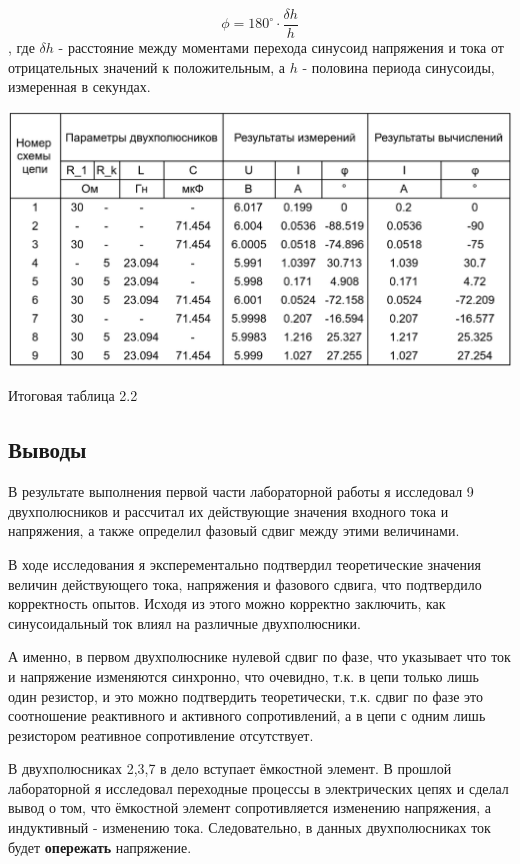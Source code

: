 \[
	\phi = 180^\circ \cdot \frac{\delta h}{h}
\]
, где $\delta h$ - расстояние между моментами перехода синусоид напряжения и тока от отрицательных значений к положительным, а $h$ - половина периода синусоиды, измеренная в секундах.

\begin{table}[H]
	\captionsetup{labelformat=empty}
	\centering
	\includegraphics[width=1\textwidth]{./data/table_2-2.png}
	\caption{Итоговая таблица 2.2}
\end{table}

\subsection{Выводы}
В результате выполнения первой части лабораторной работы я исследовал 9 двухполюсников и рассчитал их действующие значения входного тока и напряжения, а также определил фазовый сдвиг между этими величинами.

В ходе исследования я эксперементально подтвердил теоретические значения величин действующего тока, напряжения и фазового сдвига, что подтвердило корректность опытов. Исходя из этого можно корректно заключить, как синусоидальный ток влиял на различные двухполюсники.

А именно, в первом двухполюснике нулевой сдвиг по фазе, что указывает что ток и напряжение изменяются синхронно, что очевидно, т.к. в цепи только лишь один резистор, и это можно подтвердить теоретически, т.к. сдвиг по фазе это соотношение реактивного и активного сопротивлений, а в цепи с одним лишь резистором реативное сопротивление отсутствует.

В двухполюсниках 2,3,7 в дело вступает ёмкостной элемент. В прошлой лабораторной я исследовал переходные процессы в электрических цепях и сделал вывод о том, что ёмкостной элемент сопротивляется изменению напряжения, а индуктивный - изменению тока. Следовательно, в данных двухполюсниках ток будет \textbf{опережать} напряжение.

